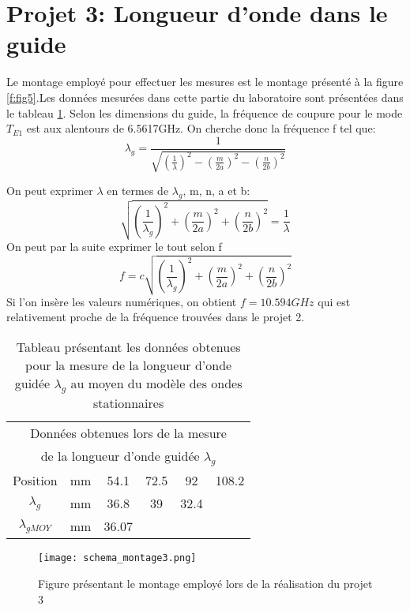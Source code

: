 \section{Projet 3: Longueur d'onde dans le guide}
Le montage employé pour effectuer les mesures est le montage présenté à la figure \ref{f:fig5}.Les données mesurées dans cette partie du laboratoire sont présentées dans le tableau \ref{tab:1}. Selon les dimensions du guide, la fréquence de coupure pour le mode $T_{E1}$ est aux alentours de 6.5617GHz. On cherche donc la fréquence f tel que:
\begin{equation}
\lambda_g = \frac{1}{\sqrt{\left(\frac{1}{\lambda}\right)^2 - \left( \frac{m}{2a}\right)^2  - \left( \frac{n}{2b}\right)^2}}
\end{equation}

On peut exprimer $\lambda$ en termes de $\lambda_g$, m, n, a et b:
\begin{equation}
\sqrt{\left(\frac{1}{\lambda_g}\right)^2 + \left(\frac{m}{2a}\right)^2  + \left(\frac{n}{2b}\right)^2} = \frac{1}{\lambda}
\end{equation}
On peut par la suite exprimer le tout selon f
\begin{equation}
f = c\sqrt{\left(\frac{1}{\lambda_g}\right)^2 + \left(\frac{m}{2a}\right)^2  +  \left(\frac{n}{2b}\right)^2}
\end{equation}
Si l'on insère les valeurs numériques, on obtient $f = 10.594GHz$ qui est relativement proche de la fréquence trouvées dans le projet 2.

\begin{table}[htbp]
  \centering
    \begin{tabular}{|c|c|cccc|}
    \multicolumn{6}{c}{Données obtenues lors de la mesure}\\
    \multicolumn{6}{c}{ de la longueur d'onde guidée $\lambda_g$} \\\hline
    Position & mm    & 54.1  & 72.5  & 92    & 108.2 \\\hline
    $\lambda_g$ & mm    & 36.8  & 39    & 32.4  &  \\\hline
    $\lambda_{gMOY}$ & mm    & 36.07 &       &       &  \\\hline
    \end{tabular}%
  \caption{Tableau présentant les données obtenues pour la mesure de la longueur d'onde guidée $\lambda_g$ au moyen du modèle des ondes stationnaires}
  \label{tab:1}%
\end{table}%
\begin{figure}
\centering
\texttt{[image: schema\_montage3.png]}
\caption{Figure présentant le montage employé lors de la réalisation du projet 3}
\label{fig:5}
\end{figure}

